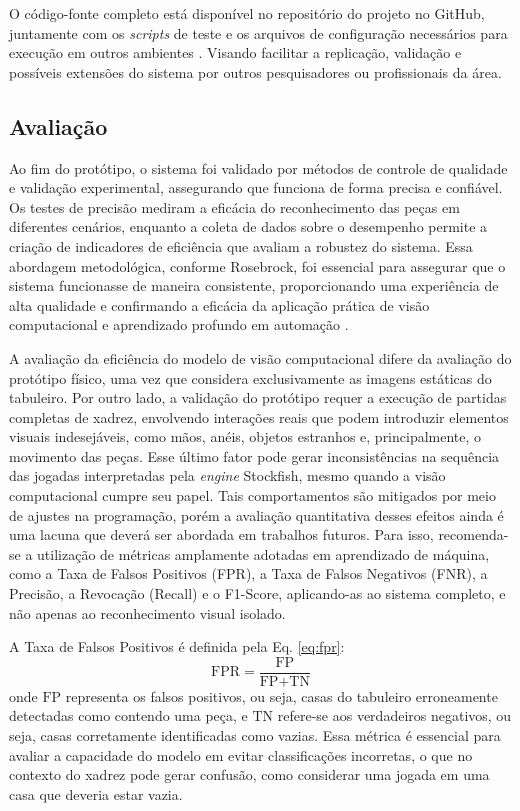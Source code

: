 \documentclass[journal]{IEEEtran} %
\begin{document}
O código-fonte completo está disponível no repositório do projeto no GitHub, juntamente com os \textit{scripts} de teste e os arquivos de configuração necessários para execução em outros ambientes \cite{chess2025}. Visando facilitar a replicação, validação e possíveis extensões do sistema por outros pesquisadores ou profissionais da área.


\subsection{Avaliação}

Ao fim do protótipo, o sistema foi validado por métodos de controle de qualidade e validação experimental, assegurando que funciona de forma precisa e confiável. Os testes de precisão mediram a eficácia do reconhecimento das peças em diferentes cenários, enquanto a coleta de dados sobre o desempenho permite a criação de indicadores de eficiência que avaliam a robustez do sistema. Essa abordagem metodológica, conforme Rosebrock, foi essencial para assegurar que o sistema funcionasse de maneira consistente, proporcionando uma experiência de alta qualidade e confirmando a eficácia da aplicação prática de visão computacional e aprendizado profundo em automação \cite{rosebrock2020}.

A avaliação da eficiência do modelo de visão computacional difere da avaliação do protótipo físico, uma vez que considera exclusivamente as imagens estáticas do tabuleiro. Por outro lado, a validação do protótipo requer a execução de partidas completas de xadrez, envolvendo interações reais que podem introduzir elementos visuais indesejáveis, como mãos, anéis, objetos estranhos e, principalmente, o movimento das peças. Esse último fator pode gerar inconsistências na sequência das jogadas interpretadas pela \textit{engine} Stockfish, mesmo quando a visão computacional cumpre seu papel. Tais comportamentos são mitigados por meio de ajustes na programação, porém a avaliação quantitativa desses efeitos ainda é uma lacuna que deverá ser abordada em trabalhos futuros. Para isso, recomenda-se a utilização de métricas amplamente adotadas em aprendizado de máquina, como a Taxa de Falsos Positivos (FPR), a Taxa de Falsos Negativos (FNR), a Precisão, a Revocação (Recall) e o F1-Score, aplicando-as ao sistema completo, e não apenas ao reconhecimento visual isolado.

A Taxa de Falsos Positivos é definida pela Eq. \ref{eq:fpr}:
\begin{equation}
\text{FPR} = \frac{\text{FP}}{\text{FP} + \text{TN}}
\label{eq:fpr}
\end{equation}
onde \(\text{FP}\) representa os falsos positivos, ou seja, casas do tabuleiro erroneamente detectadas como contendo uma peça, e \(\text{TN}\) refere-se aos verdadeiros negativos, ou seja, casas corretamente identificadas como vazias. Essa métrica é essencial para avaliar a capacidade do modelo em evitar classificações incorretas, o que no contexto do xadrez pode gerar confusão, como considerar uma jogada em uma casa que deveria estar vazia.
\end{document}
